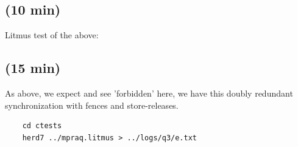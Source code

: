 \subsection{(10 min)}
Litmus test of the above:


\subsection{(15 min)}
As above, we expect and see 'forbidden' here, we have this doubly redundant synchronization with fences and store-releases. 
\begin{lstlisting}
    cd ctests
    herd7 ../mpraq.litmus > ../logs/q3/e.txt
\end{lstlisting}

